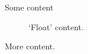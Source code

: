 \documentclass{ltx-talk}
\begin{document}
\begin{frame}
  Some content
  \begin{figure}
    `Float' content.
  \end{figure}
  More content.
\end{frame}
\end{document}
